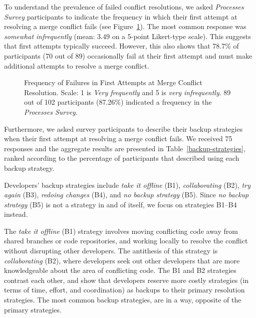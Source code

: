 To understand the prevalence of failed conflict resolutions, we asked \textit{Processes Survey} participants to indicate the frequency in which their first attempt at resolving a merge conflict fails (see Figure~\ref{fig:first-attempt-failure}).
The most common response was \textit{somewhat infrequently} (mean: $3.49$ on a 5-point Likert-type scale).
This suggests that first attempts typically succeed.
However, this also shows that 78.7\% of participants (70 out of 89) occasionally fail at their first attempt and must make additional attempts to resolve a merge conflict.

\begin{figure}
	\centering
	\caption{Frequency of Failures in First Attempts at Merge Conflict Resolution. Scale: 1 is \textit{Very frequently} and 5 is \textit{very infrequently}. 89 out of 102 participants (87.26\%) indicated a frequency in the \textit{Processes Survey}.\vspace*{-0.3\baselineskip}}
	\label{fig:first-attempt-failure}
\end{figure}

Furthermore, we asked survey participants to describe their backup strategies when their first attempt at resolving a merge conflict fails.
We received 75 responses and the aggregate results are presented in Table~\ref{backup-strategies}, ranked according to the percentage of participants that described using each backup strategy.

Developers' backup strategies include \textit{take it offline} (B1), \textit{collaborating} (B2), \textit{try again} (B3), \textit{redoing changes} (B4), and \textit{no backup strategy} (B5).
Since \textit{no backup strategy} (B5) is not a strategy in and of itself, we focus on strategies B1--B4 instead.

The \textit{take it offline} (B1) strategy involves moving conflicting code away from shared branches or code repositories, and working locally to resolve the conflict without disrupting other developers.
The antithesis of this strategy is \textit{collaborating} (B2), where developers seek out other developers that are more knowledgeable about the area of conflicting code.
The B1 and B2 strategies contrast each other, and show that developers reserve more costly strategies (in terms of time, effort, and coordination) as backups to their primary resolution strategies.
The most common backup strategies, are in a way, opposite of the primary strategies.

